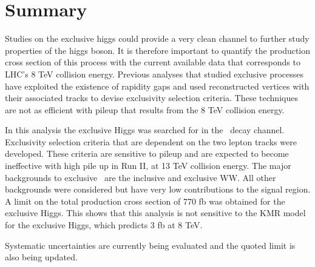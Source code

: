 \clearpage
\section{Summary}
\label{sec:summary}

\par Studies on the exclusive higgs could provide a very clean channel to further study 
properties of the higgs boson. It is therefore important to quantify the production cross 
section of this process with the current available data that corresponds to LHC's 8 TeV 
collision energy. Previous analyses that studied exclusive processes have exploited the existence 
of rapidity gaps and used reconstructed vertices with their associated tracks to devise 
exclusivity selection criteria. These techniques are not as efficient with pileup that results 
from the 8 TeV collision energy.
\par In this analysis the exclusive Higgs was searched for in the \hwwll\ decay channel. 
Exclusivity selection criteria that are dependent on the two lepton tracks were developed.
These criteria are sensitive to pileup and are expected to become ineffective with high 
pile up in Run II, at 13 TeV collision energy. The major backgrounds to exclusive \hwwll\ are
the inclusive and exclusive WW. All other backgrounds were considered but have very low 
contributions to the signal region. A limit on the total production cross section of 770 fb was 
obtained for the exclusive Higgs. This shows that this analysis is not sensitive to the KMR 
model for the exclusive Higgs, which predicts 3 fb at 8 TeV.
\par Systematic uncertainties are currently being evaluated and the quoted limit is also 
being updated.    
